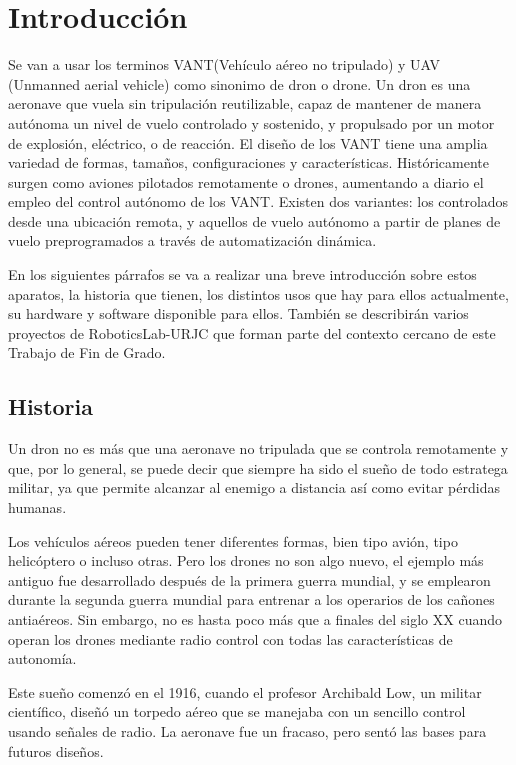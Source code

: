 \section{Introducción}

Se van a usar los terminos VANT(Vehículo aéreo no tripulado) y UAV (Unmanned aerial vehicle) como sinonimo de dron o drone. Un dron es una aeronave que vuela sin tripulación reutilizable, capaz de mantener de manera autónoma un nivel de vuelo controlado y sostenido, y propulsado por un motor de explosión, eléctrico, o de reacción. El diseño de los VANT tiene una amplia variedad de formas, tamaños, configuraciones y características. Históricamente surgen como aviones pilotados remotamente o drones, aumentando a diario el empleo del control autónomo de los VANT. Existen dos variantes: los controlados desde una ubicación remota, y aquellos de vuelo autónomo a partir de planes de vuelo preprogramados a través de automatización dinámica.


En los siguientes párrafos se va a realizar una breve introducción sobre estos
aparatos, la historia que tienen, los distintos usos que hay para ellos actualmente, su
hardware y software disponible para ellos. También se describirán varios proyectos de
RoboticsLab-URJC que forman parte del contexto cercano de este Trabajo de Fin de
Grado.

\subsection{Historia}
\label{sec:historia}

Un dron no es más que una aeronave no tripulada que se controla remotamente y que, por lo general, se puede decir que siempre ha sido el sueño de todo estratega militar, ya que permite alcanzar al enemigo a distancia así como evitar pérdidas humanas.

Los vehículos aéreos pueden tener diferentes formas, bien tipo avión, tipo helicóptero o incluso otras. Pero los drones no son algo nuevo, el ejemplo más antiguo fue desarrollado después de la primera guerra mundial, y se emplearon durante la segunda guerra mundial para entrenar a los operarios de los cañones antiaéreos. Sin embargo, no es hasta poco más que a finales del siglo XX cuando operan los drones mediante radio control con todas las características de autonomía.

Este sueño comenzó en el 1916, cuando el profesor Archibald Low, un militar científico, diseñó un torpedo aéreo que se manejaba con un sencillo control usando señales de radio. La aeronave fue un fracaso, pero sentó las bases para futuros diseños.

